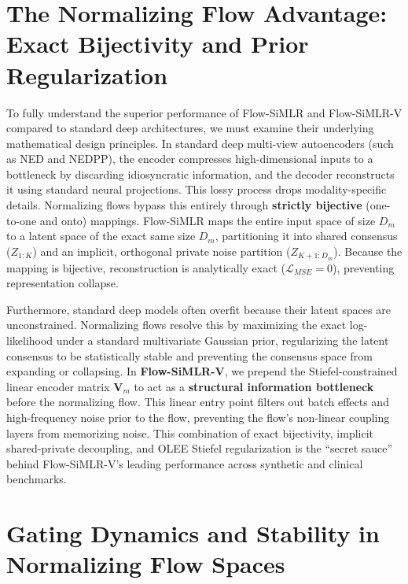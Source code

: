 \documentclass[
  letterpaper,
]{report}
\begin{document}
\section{The Normalizing Flow Advantage: Exact Bijectivity and Prior
Regularization}\label{the-normalizing-flow-advantage-exact-bijectivity-and-prior-regularization}

To fully understand the superior performance of Flow-SiMLR and
Flow-SiMLR-V compared to standard deep architectures, we must examine
their underlying mathematical design principles. In standard deep
multi-view autoencoders (such as NED and NEDPP), the encoder compresses
high-dimensional inputs to a bottleneck by discarding idiosyncratic
information, and the decoder reconstructs it using standard neural
projections. This lossy process drops modality-specific details.
Normalizing flows bypass this entirely through \textbf{strictly
bijective} (one-to-one and onto) mappings. Flow-SiMLR maps the entire
input space of size \(D_m\) to a latent space of the exact same size
\(D_m\), partitioning it into shared consensus (\(Z_{1:K}\)) and an
implicit, orthogonal private noise partition (\(Z_{K+1:D_m}\)). Because
the mapping is bijective, reconstruction is analytically exact
(\(\mathcal{L}_{MSE} = 0\)), preventing representation collapse.

Furthermore, standard deep models often overfit because their latent
spaces are unconstrained. Normalizing flows resolve this by maximizing
the exact log-likelihood under a standard multivariate Gaussian prior,
regularizing the latent consensus to be statistically stable and
preventing the consensus space from expanding or collapsing. In
\textbf{Flow-SiMLR-V}, we prepend the Stiefel-constrained linear encoder
matrix \(\mathbf{V}_m\) to act as a \textbf{structural information
bottleneck} before the normalizing flow. This linear entry point filters
out batch effects and high-frequency noise prior to the flow, preventing
the flow's non-linear coupling layers from memorizing noise. This
combination of exact bijectivity, implicit shared-private decoupling,
and OLEE Stiefel regularization is the ``secret sauce'' behind
Flow-SiMLR-V's leading performance across synthetic and clinical
benchmarks.

\section{Gating Dynamics and Stability in Normalizing Flow
Spaces}\label{gating-dynamics-and-stability-in-normalizing-flow-spaces}
\end{document}
